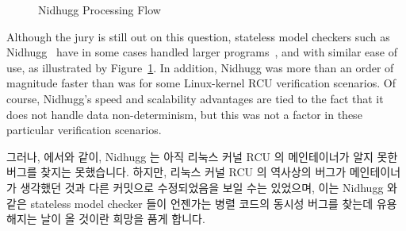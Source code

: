 \begin{figure}[tbp]
\centering
{}
\caption{Nidhugg Processing Flow}
\label{fig:formal:Nidhugg Processing Flow}
\end{figure}

Although the jury is still out on this question, stateless model
checkers such as Nidhugg~\cite{CarlLeonardsson2014Nidhugg} have in
some cases handled larger programs~\cite{SMC-TreeRCU}, and with
similar ease of use, as illustrated by
Figure~\ref{fig:formal:Nidhugg Processing Flow}.
In addition, Nidhugg was more than an order of magnitude faster than
was  for some Linux-kernel RCU verification scenarios.
Of course, Nidhugg's speed and scalability advantages are tied to
the fact that it does not handle data non-determinism, but this
was not a factor in these particular verification scenarios.
\fi

그러나,  에서와 같이, Nidhugg 는 아직 리눅스 커널 RCU 의 메인테이너가
알지 못한 버그를 찾지는 못했습니다.
하지만, 리눅스 커널 RCU 의 역사상의 버그가 메인테이너가 생각했던 것과 다른
커밋으로 수정되었음을 보일 수는 있었으며, 이는 Nidhugg 와 같은 stateless model
checker 들이 언젠가는 병렬 코드의 동시성 버그를 찾는데 유용해지는 날이 올
것이란 희망을 품게 합니다.

